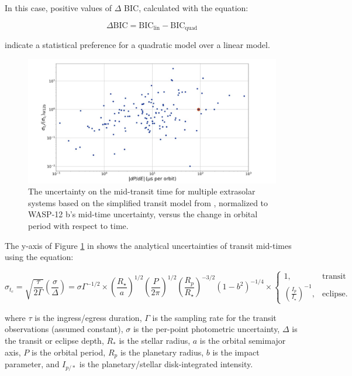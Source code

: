 \documentclass[oneside,12pt]{amsart}
\numberwithin{page}{section}
\begin{document}
In this case, positive values of $\Delta$ BIC, calculated with the equation:

\begin{equation}
    \Delta \text{BIC} = \text{BIC}_{\text{lin}} - \text{BIC}_{\text{quad}}
\end{equation}

indicate a statistical preference for a quadratic model over a linear model.

\begin{figure}[htbp]
    \centering
    \includegraphics[width=\linewidth]{figs/jackson_fig1.png}
    \caption{The uncertainty on the mid-transit time for multiple extrasolar systems based on the simplified transit model from \citet{carter2008analytic}, normalized to WASP-12 b's mid-time uncertainty, versus the change in orbital period with respect to time.}
    \label{fig:jackson-fig1}
\end{figure}

The y-axis of Figure \ref{fig:jackson-fig1} in \citet{jackson2023metrics} shows the analytical uncertainties of transit mid-times using the equation:

\begin{equation}
    \sigma_{t_c} = \sqrt{\frac{\tau}{2\Gamma}} \left(\frac{\sigma}{\Delta}\right) = \sigma \Gamma^{-1/2}
    \times \left( \frac{R_\star}{a} \right)^{1/2} \left( \frac{P}{2\pi} \right)^{1/2} 
    \left( \frac{R_p}{R_\star} \right)^{-3/2} (1 - b^2)^{-1/4} 
    \times \begin{cases}
    1, & \text{transit} \\
    \left(\frac{I_p}{I_\star}\right)^{-1}, & \text{eclipse}.
    \end{cases}
    \label{eq:analytical_transit_uncertainties}
\end{equation}

where $\tau$ is the ingress/egress duration, $\Gamma$ is the sampling rate for the transit observations (assumed constant), $\sigma$ is the per-point photometric uncertainty, $\Delta$ is the transit or eclipse depth, $R_{*}$ is the stellar radius, $a$ is the orbital semimajor axis, $P$ is the orbital period, $R_{p}$ is the planetary radius, $b$ is the impact parameter, and $I_{p/*}$ is the planetary/stellar disk-integrated intensity. 
\end{document}
